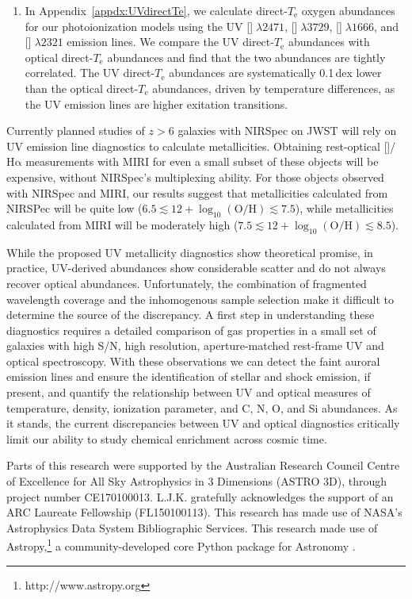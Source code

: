 \documentclass[trackchanges, preprint2]{aastex62}
\newcommand{\nii}{[\ion{N}{2}]}
\newcommand{\oiii}{[\ion{O}{3}]}
\newcommand{\oii}{[\ion{O}{2}]}
\newcommand{\ha}{\ensuremath{\mathrm{H\alpha}}\xspace}
\newcommand{\logten}{\ensuremath{\log_{10}}}
\newcommand{\logOH}{\ensuremath{\logten (\mathrm{O}/\mathrm{H})}\xspace}
\newcommand{\Te}{\ensuremath{T_{\mathrm{e}}}\xspace}
\begin{document}
\begin{enumerate}
    \item In Appendix~\ref{appdx:UVdirectTe}, we calculate direct-\Te{} oxygen abundances for our photoionization models using the UV \oii{}$\;\lambda2471$, \oii{}$\;\lambda3729$, \oiii{}$\;\lambda1666$, and \oiii{}$\;\lambda2321$ emission lines. We compare the UV direct-\Te{} abundances with optical direct-\Te abundances and find that the two abundances are tightly correlated. The UV direct-\Te abundances are systematically 0.1\,dex lower than the optical direct-\Te abundances, driven by temperature differences, as the UV emission lines are higher exitation transitions. 
\end{enumerate}

Currently planned studies of $z>6$ galaxies with NIRSpec on JWST will rely on UV emission line diagnostics to calculate metallicities. Obtaining rest-optical \nii{}/\ha{} measurements with MIRI for even a small subset of these objects will be expensive, without NIRSpec's multiplexing ability. For those objects observed with NIRSpec and MIRI, our results suggest that metallicities calculated from NIRSPec will be quite low ($6.5\lesssim 12+\logOH \lesssim 7.5$), while metallicities calculated from MIRI will be moderately high ($7.5\lesssim 12+\logOH \lesssim 8.5$).

While the proposed UV metallicity diagnostics show theoretical promise, in practice, UV-derived abundances show considerable scatter and do not always recover optical abundances. Unfortunately, the combination of fragmented wavelength coverage and the inhomogenous sample selection make it difficult to determine the source of the discrepancy. A first step in understanding these diagnostics requires a detailed comparison of gas properties in a small set of galaxies with high S/N, high resolution, aperture-matched rest-frame UV and optical spectroscopy. With these observations we can detect the faint auroral emission lines and ensure the identification of stellar and shock emission, if present, and quantify the relationship between UV and optical measures of temperature, density, ionization parameter, and C, N, O, and Si abundances. As it stands, the current discrepancies between UV and optical diagnostics critically limit our ability to study chemical enrichment across cosmic time.


\acknowledgments
Parts of this research were supported by the Australian Research Council Centre of Excellence for All Sky Astrophysics in 3 Dimensions (ASTRO 3D), through project number CE170100013. L.J.K. gratefully acknowledges the support of an ARC Laureate Fellowship (FL150100113). This research has made use of NASA's Astrophysics Data System Bibliographic Services. This research made use of Astropy,\footnote{http://www.astropy.org} a community-developed core Python package for Astronomy \citep{astropy:2013, astropy:2018}.
\end{document}
